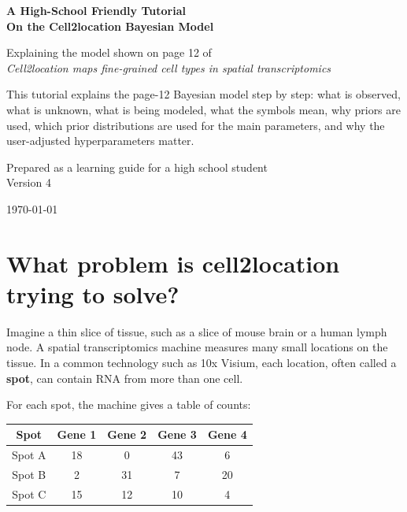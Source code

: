 \documentclass[11pt]{article}
\newcommand{\term}[1]{\textbf{#1}}
\begin{document}
\begin{titlepage}
\centering
\vspace*{0.5in}
{\Huge\bfseries A High-School Friendly Tutorial\\[0.3em]
On the Cell2location Bayesian Model\par}
\vspace{0.35in}
{\Large Explaining the model shown on page 12 of\\
\emph{Cell2location maps fine-grained cell types in spatial transcriptomics}\par}
\vspace{0.55in}
\begin{tcolorbox}[colback=softblue,colframe=deepblue,width=0.88\textwidth,arc=2mm]
\large
This tutorial explains the page-12 Bayesian model step by step: what is observed, what is unknown, what is being modeled, what the symbols mean, why priors are used, which prior distributions are used for the main parameters, and why the user-adjusted hyperparameters matter.
\end{tcolorbox}
\vfill
{\large Prepared as a learning guide for a high school student\\Version 4}\par
\vspace{0.3in}
{\large \today}\par
\end{titlepage}

\tableofcontents
\newpage

\section{What problem is cell2location trying to solve?}

Imagine a thin slice of tissue, such as a slice of mouse brain or a human lymph node. A spatial transcriptomics machine measures many small locations on the tissue. In a common technology such as 10x Visium, each location, often called a \term{spot}, can contain RNA from more than one cell.

For each spot, the machine gives a table of counts:

\begin{center}
\begin{tabular}{c|cccc}
\toprule
Spot & Gene 1 & Gene 2 & Gene 3 & Gene 4 \\
\midrule
Spot A & 18 & 0 & 43 & 6 \\
Spot B & 2 & 31 & 7 & 20 \\
Spot C & 15 & 12 & 10 & 4 \\
\bottomrule
\end{tabular}
\end{center}
\end{document}
